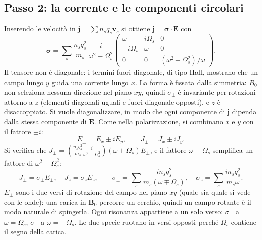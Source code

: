 \subsection{Passo 2: la corrente e le componenti circolari}
Inserendo le velocità in $\mathbf{j}=\sum n_sq_s\mathbf{v}_s$ si ottiene $\mathbf{j}=\boldsymbol\sigma\cdot\mathbf{E}$ con
\begin{equation}
\boldsymbol\sigma=\sum_s\frac{n_sq_s^2}{m_s}\,\frac{i}{\omega^2-\Omega_s^2}\begin{pmatrix}\omega&i\Omega_s&0\\-i\Omega_s&\omega&0\\0&0&(\omega^2-\Omega_s^2)/\omega\end{pmatrix}.
\end{equation}
Il tensore non è diagonale: i termini fuori diagonale, di tipo Hall, mostrano che un campo lungo $y$ guida una corrente lungo $x$. La forma è fissata dalla simmetria: $B_0$ non seleziona nessuna direzione nel piano $xy$, quindi $\sigma_\perp$ è invariante per rotazioni attorno a $z$ (elementi diagonali uguali e fuori diagonale opposti), e $z$ è disaccoppiato.
Si vuole diagonalizzare, in modo che ogni componente di $\mathbf{j}$ dipenda dalla stessa componente di $\mathbf{E}$. Come nella polarizzazione, si combinano $x$ e $y$ con il fattore $\pm i$:
\begin{equation}
E_\pm=E_x\pm iE_y,\qquad J_\pm=J_x\pm iJ_y .
\end{equation}
Si verifica che $J_\pm=\left(\frac{n_sq_s^2}{m_s}\frac{i}{\omega^2-\Omega_s^2}\right)(\omega\pm\Omega_s)E_\pm$, e il fattore $\omega\pm\Omega_s$ semplifica un fattore di $\omega^2-\Omega_s^2$:
\begin{equation}
J_\pm=\sigma_\pm E_\pm,\quad J_z=\sigma_zE_z,\qquad\sigma_\pm=\sum_s\frac{in_sq_s^2}{m_s(\omega\mp\Omega_s)},\quad\sigma_z=\sum_s\frac{in_sq_s^2}{m_s\omega}.
\end{equation}
$E_\pm$ sono i due versi di rotazione del campo nel piano $xy$ (quale sia quale si vede con le onde): una carica in $\mathbf{B}_0$ percorre un cerchio, quindi un campo rotante è il modo naturale di spingerla. Ogni risonanza appartiene a un solo verso: $\sigma_+$ a $\omega=\Omega_s$, $\sigma_-$ a $\omega=-\Omega_s$. Le due specie ruotano in versi opposti perché $\Omega_s$ contiene il segno della carica.

